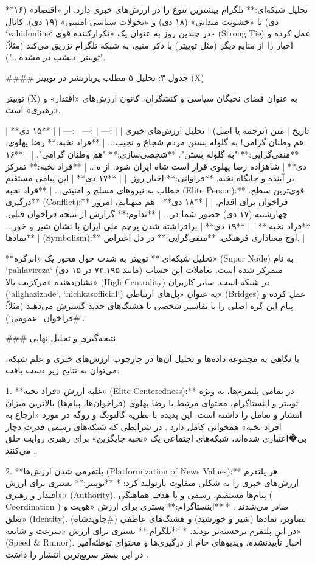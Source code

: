 \documentclass{article}
\begin{document}
**تحلیل شبکه‌ای:** تلگرام بیشترین تنوع را در ارزش‌های خبری دارد. از «اقتصاد» (۱۶ دی) تا «خشونت میدانی» (۱۸ دی) و «تحولات سیاسی-امنیتی» (۱۹ دی). کانال `vahidonline` در چندین روز به عنوان یک «تکرارکننده قوی» (Strong Tie) عمل کرده و اخبار را از منابع دیگر (مثل توییتر) با ذکر منبع، به شبکه تلگرام تزریق می‌کند (مثلاً: "توییتر: دیشب در مشده...").

#### جدول ۳: تحلیل ۵ مطلب پربازنشر در توییتر (X)

توییتر (X) به عنوان فضای نخبگان سیاسی و کنشگران، کانون ارزش‌های «اقتدار» و «رهبری» است.

| تاریخ | متن (ترجمه یا اصل) | تحلیل ارزش‌های خبری |
| :--- | :--- | :--- |
| **۱۵ دی** | هم وطنان گرامی! به گلوله بستن مردم شجاع و نجیب... | **فراد نخبه:** رضا پهلوی. **منفی‌گرایی:** "به گلوله بستن". **شخصی‌سازی:** "هم وطنان گرامی". |
| **۱۶ دی** | شاهزاده رضا پهلوی قرار است شاه ایران شود. از ه... | **فراد نخبه:** تمرکز بر آینده و جایگاه نخبه. **فراوانی:** اخبار روز. |
| **۱۷ دی** | این پیامی مستقیم خطاب به نیروهای مسلح و امنیتی... | **فراد نخبه (Elite Person):** قوی‌ترین سطح. **درگیری (Conflict):** فراخوان برای اقدام. |
| **۱۸ دی** | هم میهنانم، امروز چهارشنبه (۱۷ دی) حضور شما در... | **تداوم:** گزارش از نتیجه فراخوان قبلی. **فراد نخبه.** |
| **۱۹ دی** | برافراشته شدن پرچم ملی ایران با نشان شیر و خور... | **نمادها (Symbolism):** اوج معناداری فرهنگی. **منفی‌گرایی:** در دل اعتراض. |

**تحلیل شبکه‌ای:** توییتر به شدت حول محور یک «ابرگره» (Super Node) به نام `pahlavireza` متمرکز شده است. تعاملات این حساب (مانند ۷۳,۱۹۵ در ۱۵ دی) نشان‌دهنده «مرکزیت بالا» (High Centrality) در شبکه است. سایر کاربران (`alighazizade`, `hichkasofficial`) به عنوان «پل‌های ارتباطی» (Bridges) عمل کرده و پیام این گره اصلی را با تفاسیر شخصی یا هشتگ‌های جدید گسترش می‌دهند (مثلاً: `#فراخوان_عمومی`).

### نتیجه‌گیری و تحلیل نهایی

با نگاهی به مجموعه داده‌ها و تحلیل آن‌ها در چارچوب ارزش‌های خبری و علم شبکه، می‌توان به نتایج زیر دست یافت:

1.  **غلبه ارزش «فراد نخبه» (Elite-Centeredness):** در تمامی پلتفرم‌ها، به ویژه توییتر و اینستاگرام، محتوای مرتبط با رضا پهلوی (فراخوان‌ها، پیام‌ها) بالاترین میزان انتشار و تعامل را داشته است. این پدیده با نظریه گالتونگ و روگه در مورد «ارجاع به افراد نخبه» همخوانی کامل دارد . در شرایطی که شبکه‌های رسمی قدرت دچار بی�اعتباری شده‌اند، شبکه‌های اجتماعی یک «نخبه جایگزین» برای رهبری روایت خلق می‌کنند .

2.  **پلتفرمی شدن ارزش‌ها (Platformization of News Values):** هر پلتفرم ارزش‌های خبری را به شکلی متفاوت بازتولید کرد:
*   **توییتر:** بستری برای ارزش «اقتدار و رهبری» (Authority). پیام‌ها مستقیم، رسمی و با هدف هماهنگی ( Coordination ) صادر می‌شدند .
*   **اینستاگرام:** بستری برای ارزش «هویت و تعلق» (Identity). تصاویر، نمادها (شیر و خورشید) و هشتگ‌های عاطفی (#جاویدشاه) در این پلتفرم برجسته‌تر بودند.
*   **تلگرام:** بستری برای ارزش «سرعت و شایعه» (Speed & Rumor). اخبار تأییدنشده، ویدیوهای خام از درگیری‌ها و محتوای توطئه‌آمیز در این بستر سریع‌ترین انتشار را داشت .
\end{document}
